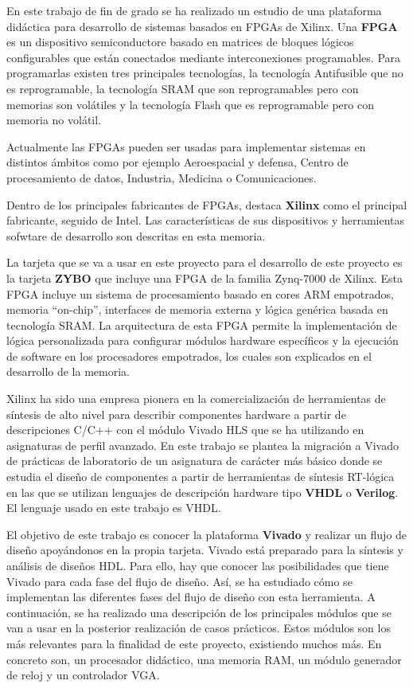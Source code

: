 En este trabajo de fin de grado se ha realizado un estudio de una plataforma didáctica para desarrollo de sistemas basados en FPGAs de Xilinx. 
Una \textbf{FPGA} es un dispositivo semiconductore basado en matrices de bloques lógicos configurables que están conectados mediante interconexiones programables. 
Para programarlas existen tres principales tecnologías, la tecnología Antifusible que no es reprogramable, la tecnología SRAM que son reprogramables 
pero con memorias son volátiles y la tecnología Flash que es reprogramable pero con memoria no volátil. 

Actualmente las FPGAs pueden ser usadas para implementar sistemas en distintos ámbitos como por ejemplo Aeroespacial y defensa, 
Centro de procesamiento de datos, Industria, Medicina o Comunicaciones.

Dentro de los principales fabricantes de FPGAs, destaca \textbf{Xilinx} como el principal fabricante, seguido de Intel. Las características de sus dispositivos 
y herramientas sofwtare de desarrollo son descritas en esta memoria.

La tarjeta que se va a usar en este proyecto para el desarrollo de este proyecto es la tarjeta \textbf{ZYBO} que incluye una FPGA de la familia Zynq-7000 de Xilinx. Esta FPGA incluye 
un sistema de procesamiento basado en cores ARM empotrados, memoria ``on-chip'', interfaces de memoria externa y lógica genérica basada en tecnología SRAM. La arquitectura 
de esta FPGA permite la implementación de lógica personalizada para configurar módulos hardware específicos y la ejecución de software en los procesadores empotrados, los cuales 
son explicados en el desarrollo de la memoria. 

Xilinx ha sido una empresa pionera en la comercialización de herramientas de síntesis de alto nivel para describir componentes hardware a partir de descripciones C/C++ 
con el módulo Vivado HLS que se ha utilizando en asignaturas de perfil avanzado. En este trabajo se plantea la migración a Vivado de prácticas de laboratorio 
de un asignatura de carácter más básico donde se estudia el diseño de componentes a partir de herramientas de síntesis RT-lógica en las que se utilizan lenguajes 
de descripción hardware tipo \textbf{VHDL} o \textbf{Verilog}. El lenguaje usado en este trabajo es VHDL.

El objetivo de este trabajo es conocer la plataforma \textbf{Vivado} y realizar un flujo de diseño apoyándonos en la propia tarjeta. Vivado está preparado 
para la síntesis y análisis de diseños HDL. Para ello, hay que conocer las posibilidades que tiene Vivado para cada fase del flujo de diseño. Así, se ha estudiado cómo 
se implementan las diferentes fases del flujo de diseño con esta herramienta. A continuación, se ha realizado una descripción de los principales módulos que se van a 
usar en la posterior realización de casos prácticos. Estos módulos son los más relevantes para la finalidad de este proyecto, existiendo muchos más. En concreto son, 
un procesador didáctico, una memoria RAM, un módulo generador de reloj y un controlador VGA.

